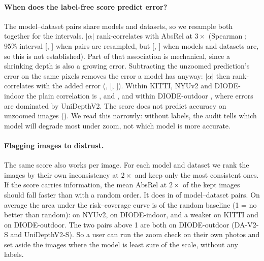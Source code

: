 \documentclass[10pt,twocolumn,letterpaper]{article}
\begin{document}
\paragraph{When does the label-free score predict error?}
The \proxyPairs{} model--dataset pairs share models and datasets, so we resample both together for
the intervals. $|\alpha|$ rank-correlates with AbsRel at $3\times$ (Spearman \proxyRhoThree; 95\% interval
[\proxyRhoThreeLo, \proxyRhoThreeHi] when pairs are resampled, but [\proxyRhoThreeTwoWayLo,
\proxyRhoThreeTwoWayHi] when models and datasets are, so this is not established). Part of that association is
mechanical, since a shrinking depth is also a growing error. Subtracting the unzoomed prediction's error on the
same pixels removes the error a model has anyway: $|\alpha|$ then rank-correlates with the added error
(\proxyRhoDeltaThreeTwoWay, [\proxyRhoDeltaThreeTwoWayLo, \proxyRhoDeltaThreeTwoWayHi]). Within KITTI, NYUv2 and
DIODE-indoor the plain correlation is \ProxyKitti, \ProxyNyu{} and \ProxyDiodeIn, and within DIODE-outdoor
\ProxyDiodeOut, where errors are dominated by UniDepthV2. The score does not predict accuracy on unzoomed images
(\proxyRhoOne). We read this narrowly: without labels, the audit tells which model will
degrade most under zoom, not which model is more accurate.

\paragraph{Flagging images to distrust.}
The same score also works per image. For each model and dataset we rank the images by their own
inconsistency at $2\times$ and keep only the most consistent ones. If the score carries information, the
mean AbsRel at $2\times$ of the kept images should fall faster than with a random order. It does in
\riskBelowOne{} of \riskPairs{} model--dataset pairs. On average the area under the risk--coverage curve
is \riskAurc{} of the random baseline (1 = no better than random): \RiskNyu{} on NYUv2, \RiskDiodeIn{} on
DIODE-indoor, and a weaker \RiskKitti{} on KITTI and \RiskDiodeOut{} on DIODE-outdoor. The two pairs above
1 are both on DIODE-outdoor (DA-V2-S and UniDepthV2-S). So a user can run the zoom check on their own photos and set aside the images where the model is
least sure of the scale, without any labels.
\end{document}
